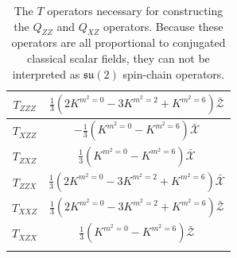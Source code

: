 \begin{table}
%
\begin{center}
%
\begingroup
\setlength{\tabcolsep}{7pt} %
\renewcommand{\arraystretch}{2.0} %
%
\begin{tabular}{ !{\vrule width 1.5pt}c!{\vrule width 1.5pt}c!{\vrule width 1.5pt} }
 	$T_{ZZZ}$ & $\frac{1}{3} \left( 2 K^{m^2 = 0} - 3 K^{m^2 = 2} + K^{m^2 = 6} \right) \bar{\mathcal{Z}}$ \\
 	\hline
 	$T_{XZZ}$ & $-\frac{1}{3} \left( K^{m^2=0} - K^{m^2=6} \right) \bar{\mathcal{X}}$ \\
 	\hline
 	$T_{ZXZ}$ & $\frac{1}{3} \left( K^{m^2=0} - K^{m^2=6} \right) \bar{\mathcal{X}}$ \\
 	\hline
 	$T_{ZZX}$ & $\frac{1}{3} \left( 2 K^{m^2 = 0} - 3 K^{m^2 = 2} + K^{m^2 = 6} \right) \bar{\mathcal{X}}$ \\
 	\hline
 	$T_{XXZ}$ & $\frac{1}{3} \left( 2 K^{m^2 = 0} - 3 K^{m^2 = 2} + K^{m^2 = 6} \right) \bar{\mathcal{Z}}$ \\
 	\hline
 	$T_{XZX}$ & $\frac{1}{3} \left( K^{m^2=0} - K^{m^2=6} \right) \bar{\mathcal{Z}}$ \\
\end{tabular}
%
\endgroup
%
\end{center}
%
\caption[$T$ operators necessary for constructing $Q_{ZZ}$ and $Q_{XZ}$]{The $T$ operators necessary for constructing the $Q_{ZZ}$ and $Q_{XZ}$ operators. Because these operators are all proportional to conjugated classical scalar fields, they can not be interpreted as $\mathfrak{su}(2)$ spin-chain operators.}
%
\label{tab:T-table-1}
%
\end{table}
%
%

